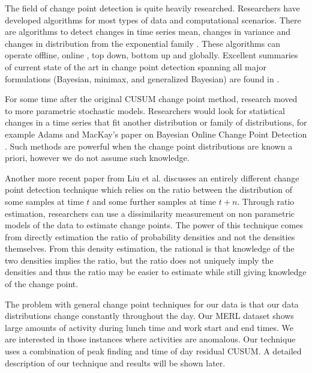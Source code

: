 The field of change point detection is quite heavily researched.  Researchers have developed algorithms for most types of data and computational scenarios.  There are algorithms to detect changes in time series mean, changes in variance and changes in distribution from the exponential family \cite{Dessein2013}.  These algorithms can operate offline, online \cite{Tartakovsky2013}, top down, bottom up and globally.  Excellent summaries of current state of the art in change point detection spanning all major formulations (Bayesian, minimax, and generalized Bayesian) are found in \cite{Polunchenko2012, Reeves2007}.  

For some time after the original CUSUM change point method, research moved to more parametric stochastic models.  Researchers would look for statistical changes in a time series that fit another distribution or family of distributions, for example Adams and MacKay's paper on Bayesian Online Change Point Detection \cite{Adams2007}.  Such methods are powerful when the change point distributions are known a priori, however we do not assume such knowledge.  

Another more recent paper from Liu et al. \cite{Liu2013} discusses an entirely different change point detection technique which relies on the ratio between the distribution of some samples at time $t$ and some further samples at time $t + n$.  Through ratio estimation, researchers can use a dissimilarity measurement on non parametric models of the data to estimate change points.  The power of this technique comes from directly estimation the ratio of probability densities and not the densities themselves.  From this density estimation, the rational is that knowledge of the two densities implies the ratio, but the ratio does not uniquely imply the densities and thus the ratio may be easier to estimate while still giving knowledge of the change point.  

The problem with general change point techniques for our data is that our data distributions change constantly throughout the day.  Our MERL dataset shows large amounts of activity during lunch time and work start and end times.  We are interested in those instances where activities are anomalous.  Our technique uses a combination of peak finding and time of day residual CUSUM.  A detailed description of our technique and results will be shown later.

